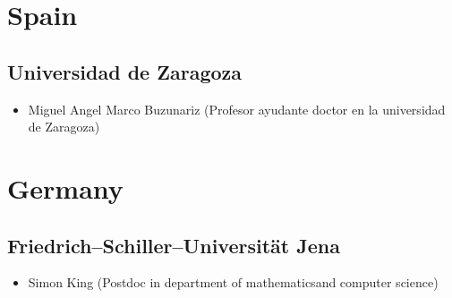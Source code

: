 

\newcommand{\CS}{computer science}
\newcommand{\MATH}{mathematics}

\section*{Spain}

\subsection*{Universidad de Zaragoza}
\begin{itemize}
\item Miguel Angel Marco Buzunariz (Profesor ayudante doctor en la universidad de Zaragoza)
\end{itemize}

\section*{Germany}

\subsection{Friedrich--Schiller--Universität Jena}
\begin{itemize}
\item Simon King (Postdoc in department of \MATH and \CS)
\end{itemize}

